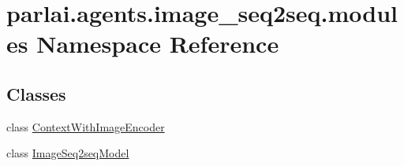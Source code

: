 \hypertarget{namespaceparlai_1_1agents_1_1image__seq2seq_1_1modules}{}\section{parlai.\+agents.\+image\+\_\+seq2seq.\+modules Namespace Reference}
\label{namespaceparlai_1_1agents_1_1image__seq2seq_1_1modules}
\subsection*{Classes}
\begin{DoxyCompactItemize}
\item 
class \hyperlink{classparlai_1_1agents_1_1image__seq2seq_1_1modules_1_1ContextWithImageEncoder}{Context\+With\+Image\+Encoder}
\item 
class \hyperlink{classparlai_1_1agents_1_1image__seq2seq_1_1modules_1_1ImageSeq2seqModel}{Image\+Seq2seq\+Model}
\end{DoxyCompactItemize}
